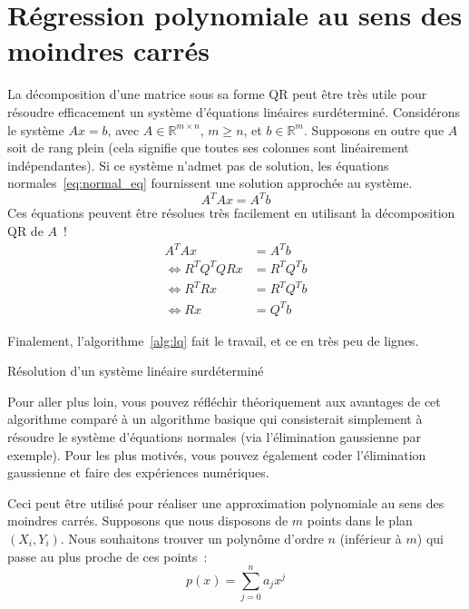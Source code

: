 \documentclass[a4paper, 12pt]{article}
\begin{document}
\section{Régression polynomiale au sens des moindres carrés}\label{app:lq}
La décomposition d'une matrice sous sa forme QR peut être très utile pour résoudre efficacement un système d'équations linéaires surdéterminé. Considérons le système $Ax = b$, avec $A \in {\mathbb{R}}^{m \times n}$, $m \geq n$, et $b \in {\mathbb{R}}^{m}$. Supposons en outre que $A$ soit de rang plein (cela signifie que toutes ses colonnes sont linéairement indépendantes). Si ce système n'admet pas de solution, les équations normales~\ref{eq:normal_eq} fournissent une solution approchée au système.
\begin{equation}
    A^T A x = A^T b \label{eq:normal_eq}
\end{equation}
Ces équations peuvent être résolues très facilement en utilisant la décomposition QR de $A$~!
\begin{align*}
                    A^T     A   x &= A^T     b \\
    \Leftrightarrow R^T Q^T Q R x &= R^T Q^T b \\
    \Leftrightarrow R^T       R x &= R^T Q^T b \\
    \Leftrightarrow           R x &=     Q^T b
\end{align*}

\noindent Finalement, l'algorithme~\ref{alg:lq} fait le travail, et ce en très peu de lignes.

\begin{algorithm}
    \caption{Résolution d'un système linéaire surdéterminé}\label{alg:lq}
    \begin{algorithmic}[1]
    \end{algorithmic}
\end{algorithm}

Pour aller plus loin, vous pouvez réfléchir théoriquement aux avantages de cet algorithme comparé à un algorithme basique qui consisterait simplement à résoudre le système d'équations normales (via l'élimination gaussienne par exemple). Pour les plus motivés, vous pouvez également coder l'élimination gaussienne et faire des expériences numériques.

\noindent Ceci peut être utilisé pour réaliser une approximation polynomiale au sens des moindres carrés. Supposons que nous disposons de $m$ points dans le plan $(X_i, Y_i)$. Nous souhaitons trouver un polynôme d'ordre $n$ (inférieur à $m$) qui passe au plus proche de ces points~:
\begin{equation*}
    p(x) = \sum_{j=0}^{n} a_j x^j
\end{equation*}
\end{document}
